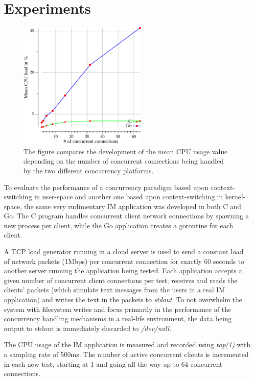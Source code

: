 \section{Experiments}
\begin{figure}[!t]
	\centering
	\includegraphics[width=2.5in]{img/mean.pdf}
	\caption{The figure compares the development of the mean CPU usage value depending on the number of concurrent connections being handled by the two different concurrency platforms.}
	\label{fig_mean_values}
\end{figure}
To evaluate the performance of a concurrency paradigm based upon context-switching in user-space and another one based upon context-switching in kernel-space, the same very rudimentary IM application was developed in both C and Go. The C program handles concurrent client network connections by spawning a new process per client, while the Go application creates a goroutine for each client. 

A TCP load generator running in a cloud server is used to send a constant load of network packets (1Mbps) per concurrent connection for exactly 60 seconds to another server running the application being tested. Each application accepts a given number of concurrent client connections per test, receives and reads the clients' packets (which simulate text messages from the users in a real IM application) and writes the text in the packets to \textit{stdout}. To not overwhelm the system with filesystem writes and focus primarily in the performance of the concurrency handling mechanisms in a real-life environment, the data being output to stdout is immediately discarded to \textit{/dev/null}. 

The CPU usage of the IM application is measured and recorded using \textit{top(1)} with a sampling rate of 500ms. The number of active concurrent clients is incremented in each new test, starting at 1 and going all the way up to 64 concurrent connections.

